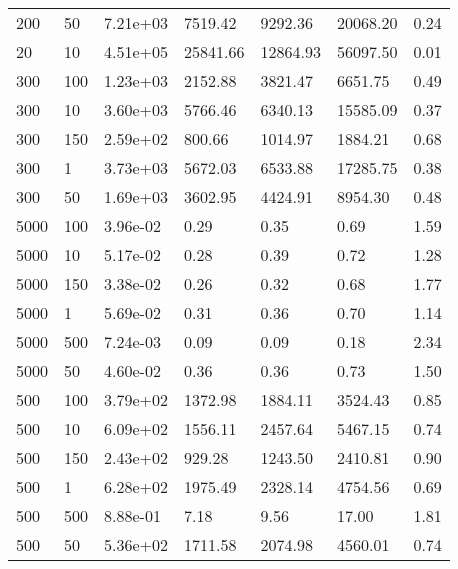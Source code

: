 \begin{table}
\begin{tabular}{lllllll}
200       &   50        &   7.21e+03  &   7519.42   &   9292.36   &   20068.20  &   0.24      \\ 
20        &   10        &   4.51e+05  &   25841.66  &   12864.93  &   56097.50  &   0.01      \\ 
300       &   100       &   1.23e+03  &   2152.88   &   3821.47   &   6651.75   &   0.49      \\ 
300       &   10        &   3.60e+03  &   5766.46   &   6340.13   &   15585.09  &   0.37      \\ 
300       &   150       &   2.59e+02  &   800.66    &   1014.97   &   1884.21   &   0.68      \\ 
300       &   1         &   3.73e+03  &   5672.03   &   6533.88   &   17285.75  &   0.38      \\ 
300       &   50        &   1.69e+03  &   3602.95   &   4424.91   &   8954.30   &   0.48      \\ 
5000      &   100       &   3.96e-02  &   0.29      &   0.35      &   0.69      &   1.59      \\ 
5000      &   10        &   5.17e-02  &   0.28      &   0.39      &   0.72      &   1.28      \\ 
5000      &   150       &   3.38e-02  &   0.26      &   0.32      &   0.68      &   1.77      \\ 
5000      &   1         &   5.69e-02  &   0.31      &   0.36      &   0.70      &   1.14      \\ 
5000      &   500       &   7.24e-03  &   0.09      &   0.09      &   0.18      &   2.34      \\ 
5000      &   50        &   4.60e-02  &   0.36      &   0.36      &   0.73      &   1.50      \\ 
500       &   100       &   3.79e+02  &   1372.98   &   1884.11   &   3524.43   &   0.85      \\ 
500       &   10        &   6.09e+02  &   1556.11   &   2457.64   &   5467.15   &   0.74      \\ 
500       &   150       &   2.43e+02  &   929.28    &   1243.50   &   2410.81   &   0.90      \\ 
500       &   1         &   6.28e+02  &   1975.49   &   2328.14   &   4754.56   &   0.69      \\ 
500       &   500       &   8.88e-01  &   7.18      &   9.56      &   17.00     &   1.81      \\ 
500       &   50        &   5.36e+02  &   1711.58   &   2074.98   &   4560.01   &   0.74      \\ 

\end{tabular}
\end{table}
